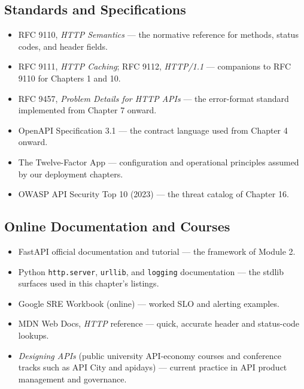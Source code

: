 \subsection{Standards and Specifications}
\begin{itemize}
  \item RFC 9110, \emph{HTTP Semantics} \cite{rfc9110} --- the normative
    reference for methods, status codes, and header fields.
  \item RFC 9111, \emph{HTTP Caching}; RFC 9112, \emph{HTTP/1.1} ---
    companions to RFC 9110 for Chapters 1 and 10.
  \item RFC 9457, \emph{Problem Details for HTTP APIs} --- the error-format
    standard implemented from Chapter 7 onward.
  \item OpenAPI Specification 3.1 \cite{openapi31} --- the contract language
    used from Chapter 4 onward.
  \item The Twelve-Factor App \cite{twelvefactor} --- configuration and
    operational principles assumed by our deployment chapters.
  \item OWASP API Security Top 10 (2023) --- the threat catalog of
    Chapter 16.
\end{itemize}

\subsection{Online Documentation and Courses}
\begin{itemize}
  \item FastAPI official documentation and tutorial --- the framework of
    Module 2.
  \item Python \texttt{http.server}, \texttt{urllib}, and \texttt{logging}
    documentation --- the stdlib surfaces used in this chapter's listings.
  \item Google SRE Workbook (online) --- worked SLO and alerting examples.
  \item MDN Web Docs, \emph{HTTP} reference --- quick, accurate header and
    status-code lookups.
  \item \emph{Designing APIs} (public university API-economy courses and
    conference tracks such as API City and apidays) --- current practice in
    API product management and governance.
\end{itemize}

